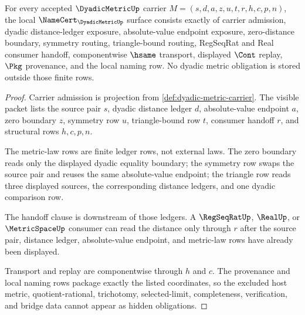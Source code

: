 \begin{theorem}
\label{thm:dyadic-metric-namecert-obligations}
For every accepted $\DyadicMetricUp$ carrier $M=(s,d,a,z,u,t,r,h,c,p,n)$, the local $\NameCert_{\DyadicMetricUp}$ surface consists exactly of carrier admission, dyadic distance-ledger exposure, absolute-value endpoint exposure, zero-distance boundary, symmetry routing, triangle-bound routing, RegSeqRat and Real consumer handoff, componentwise $\hsame$ transport, displayed $\Cont$ replay, $\Pkg$ provenance, and the local naming row. No dyadic metric obligation is stored outside those finite rows.
\end{theorem}
\begin{proof}
Carrier admission is projection from \autoref{def:dyadic-metric-carrier}. The visible packet lists the source pair $s$, dyadic distance ledger $d$, absolute-value endpoint $a$, zero boundary $z$, symmetry row $u$, triangle-bound row $t$, consumer handoff $r$, and structural rows $h,c,p,n$.

The metric-law rows are finite ledger rows, not external laws. The zero boundary reads only the displayed dyadic equality boundary; the symmetry row swaps the source pair and reuses the same absolute-value endpoint; the triangle row reads three displayed sources, the corresponding distance ledgers, and one dyadic comparison row.

The handoff clause is downstream of those ledgers. A $\RegSeqRatUp$, $\RealUp$, or $\MetricSpaceUp$ consumer can read the distance only through $r$ after the source pair, distance ledger, absolute-value endpoint, and metric-law rows have already been displayed.

Transport and replay are componentwise through $h$ and $c$. The provenance and local naming rows package exactly the listed coordinates, so the excluded host metric, quotient-rational, trichotomy, selected-limit, completeness, verification, and bridge data cannot appear as hidden obligations.
\end{proof}

